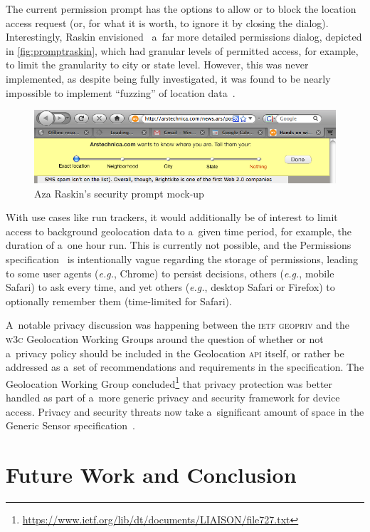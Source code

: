\documentclass[sigconf,hyphens]{acmart}
\begin{document}
The current permission prompt has the options to allow or to block
the location access request (or, for what it is worth, to ignore it by closing the dialog).
Interestingly, Raskin envisioned~\cite{raskin2010geolocation} a~far more detailed permissions
dialog, depicted in \autoref{fig:promptraskin}, which had granular levels of permitted access,
for example, to limit the granularity to city or state level.
However, this was never implemented, as despite being fully investigated, it was found to be nearly
impossible to implement ``fuzzing'' of location data~\cite{thomson2011obscuring}.

\begin{figure}[t]
  \includegraphics[width=0.55\columnwidth]{mockup-prompt.png}
  \caption{Aza Raskin's security prompt mock-up~\cite{raskin2010geolocation}}
  \label{fig:promptraskin}
\end{figure}

With use cases like run trackers, it would additionally be of interest
to limit access to background geolocation data to a~given time period,
for example, the duration of a~one hour run.
This is currently not possible, and the Permissions specification~\cite{lamouri2017permissions}
is intentionally vague regarding the storage of permissions,
leading to some user agents (\textit{e.g.}, Chrome) to persist decisions,
others (\textit{e.g.}, mobile Safari) to ask every time,
and yet others (\textit{e.g.}, desktop Safari or Firefox)
to optionally remember them (time-limited for Safari).

A~notable privacy discussion was happening between the \textsc{ietf} \textsc{geopriv}
and the \textsc{w3c} Geolocation Working Groups around the question of whether or not
a~privacy policy should be included in the Geolocation \textsc{api} itself,
or rather be addressed as a~set of recommendations and requirements in the specification.
The Geolocation Working Group
concluded\footnote{\url{https://www.ietf.org/lib/dt/documents/LIAISON/file727.txt}}
that privacy protection was better handled
as part of a~more generic privacy and security framework for device access.
Privacy and security threats now take a~significant amount of space
in the Generic Sensor specification~\cite{waldron2018genericsensor}.

\section{Future Work and Conclusion}
\end{document}

